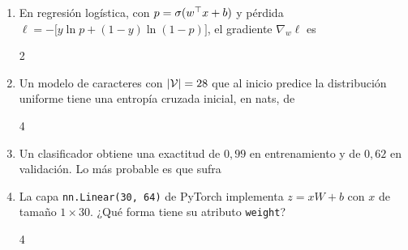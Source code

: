 \begin{enumerate}[label=\textbf{\arabic*.},leftmargin=2em,itemsep=8pt,ref=\arabic*]
\item\label{q:7}  En regresión logística, con $p=\sigma(w^{\top} x+b)$ y pérdida $\ell=-\bigl[y\ln p+(1-y)\ln(1-p)\bigr]$, el gradiente $\nabla_w\ell$ es
\begin{multicols}{2}
\end{multicols}

\item\label{q:8}  Un modelo de caracteres con $\lvert\mathcal{V}\rvert=28$ que al inicio predice la distribución uniforme tiene una entropía cruzada inicial, en nats, de
\begin{multicols}{4}
\end{multicols}

\item\label{q:9}  Un clasificador obtiene una exactitud de $0{,}99$ en entrenamiento y de $0{,}62$ en validación. Lo más probable es que sufra

\item\label{q:10}  La capa \texttt{nn.Linear(30, 64)} de PyTorch implementa $z=xW+b$ con $x$ de tamaño $1\times 30$. ¿Qué forma tiene su atributo \texttt{weight}?
\begin{multicols}{4}
\end{multicols}


\end{enumerate}
